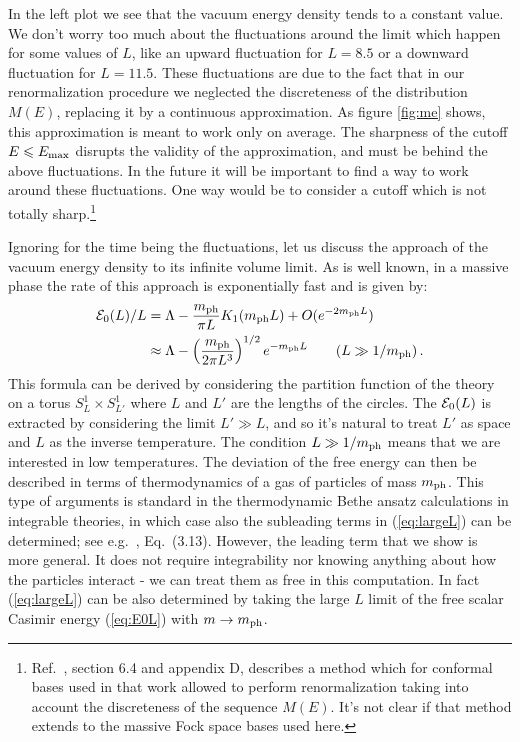 \documentclass[11pt]{article}
\newcommand{\reef}[1]{(\ref{#1})}
\def\nn{\nonumber}
\def\calE {{\cal E}}
\def\le{\leqslant}
\def\phys{{\rm ph}}
\def \Emax{E_{\rm max}}
\numberwithin{equation}{section}
\begin{document}
In the left plot we see that the vacuum energy density tends to a constant value. We don't worry too much about the fluctuations around the limit which happen for some values of $L$, like an upward fluctuation for $L=8.5$ or a downward fluctuation for $L=11.5$. These fluctuations are due to the fact that in our renormalization procedure we neglected the discreteness of the distribution $M(E)$, replacing it by a continuous approximation. As figure \ref{fig:me} shows, this approximation is meant to work only on average. The sharpness of the cutoff $E\le \Emax$ disrupts the validity of the approximation, and must be behind the above fluctuations. In the future it will be important to find a way to work around these fluctuations. One way would be to consider a cutoff which is not totally sharp.\footnote{Ref.~\cite{Hogervorst:2014rta}, section 6.4 and appendix D, describes a method which for conformal bases used in that work allowed to perform renormalization taking into account the discreteness of the sequence $M(E)$. It's not clear if that method extends to the massive Fock space bases used here.}

Ignoring for the time being the fluctuations, let us discuss the approach of the vacuum energy density to its infinite volume limit.
As is well known, in a massive phase the rate of this approach is exponentially fast and is given by:\begin{align}
\calE_0(L)/L &= \Lambda -\frac{m_\phys}{\pi L} K_1(m_\phys L)+O(e^{-2 m_\phys L})\nn\\
&\approx \Lambda -\left(\frac{m_\phys} {2 \pi L^3}\right)^{1/2} e^{- m_\phys L}\qquad (L\gg 1/m_\phys)\,.
\label{eq:largeL}
\end{align}
This formula can be derived by considering the partition function of the theory on a torus $S^1_L\times S^1_{L'}$ where $L$ and $L'$ are the lengths of the circles. The $\calE_0(L)$ is extracted by considering the limit $L'\gg L$, and so it's natural to treat $L'$ as space and $L$ as the inverse temperature. The condition $L\gg 1/m_\phys$ means that we are interested in low temperatures. The deviation of the free energy can then be described in terms of thermodynamics of a gas of particles of mass $m_\phys$. This type of arguments is standard in the thermodynamic Bethe ansatz calculations in integrable theories, in which case also the subleading terms in \reef{eq:largeL} can be determined; see 
e.g.~\cite{Zamolodchikov:1989cf}, Eq.~(3.13). However, the leading term that we show is more general. It does not require integrability nor knowing anything about how the particles interact - we can treat them as free in this computation. In fact 
\reef{eq:largeL} can be also determined by taking the large $L$ limit of the free scalar Casimir energy \reef{eq:E0L} with $m\to m_\phys$.
\end{document}
